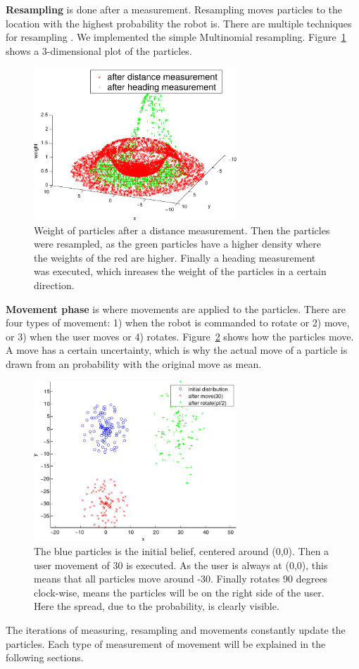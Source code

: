 \documentclass[journal]{IEEEtran}
\let\MYoriglatexcaption\caption
\renewcommand{\caption}[2][\relax]{\MYoriglatexcaption[#2]{#2}}
\begin{document}
\textbf{Resampling} is done after a measurement. Resampling moves particles
to the location with the highest probability the robot is. There are multiple
techniques for resampling \cite{douc2005comparison}. We implemented the
simple Multinomial resampling. Figure~\ref{fig:particle-measurement} shows a
3-dimensional plot of the particles.
%
\begin{figure}[htpb]
 \centering
 \includegraphics[width=3in]{images/particle-measure.pdf}
 \caption{Weight of particles after a distance measurement. Then the particles
 were resampled, as the green particles have a higher density where the weights
of the red are higher. Finally a heading measurement was executed, which
inreases the weight of the particles in a certain direction.}
 \label{fig:particle-measurement}
\end{figure}
%
\textbf{Movement phase} is where movements are applied to the particles. There
are four types of movement: 1) when the robot is commanded to rotate or 2) move,
or 3) when the user moves or 4) rotates. Figure~\ref{fig:particle-move} shows
how the particles move. A move has a certain uncertainty, which is why the
actual move of a particle is drawn from an probability with the original move
as mean.
%
\begin{figure}[htpb]
 \centering
 \includegraphics[width=3in]{images/particle-move.pdf}
 \caption{The blue particles is the initial belief, centered around (0,0). Then
 a user movement of 30 is executed. As the user is always at (0,0), this means
that all particles move around -30. Finally rotates 90 degrees clock-wise,
means the particles will be on the right side of the user. Here the spread,
due to the probability, is clearly visible.}
 \label{fig:particle-move}
\end{figure}
%
The iterations of measuring, resampling and movements constantly update the
particles. Each type of measurement of movement will be explained in the
following sections.
\end{document}
